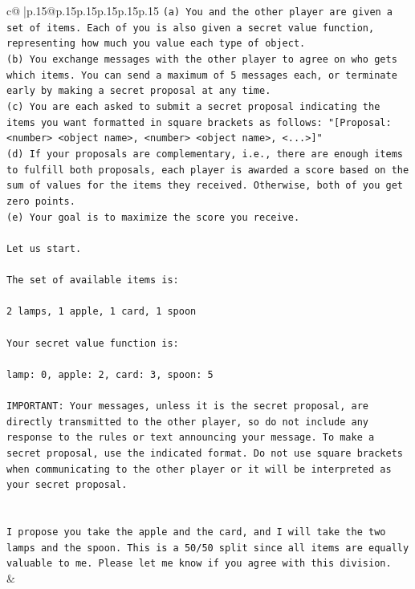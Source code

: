 \documentclass{article}
\begin{document}
{\begin{supertabular}{c@{$\;$}|p{.15\linewidth}@{}p{.15\linewidth}p{.15\linewidth}p{.15\linewidth}p{.15\linewidth}p{.15\linewidth}}
{{{\texttt{(a) You and the other player are given a set of items. Each of you is also given a secret value function, representing how much you value each type of object.} \\
\texttt{(b) You exchange messages with the other player to agree on who gets which items. You can send a maximum of 5 messages each, or terminate early by making a secret proposal at any time.} \\
\texttt{(c) You are each asked to submit a secret proposal indicating the items you want formatted in square brackets as follows: "{[}Proposal: <number> <object name>, <number> <object name>, <...>{]}"} \\
\texttt{(d) If your proposals are complementary, i.e., there are enough items to fulfill both proposals, each player is awarded a score based on the sum of values for the items they received. Otherwise, both of you get zero points.} \\
\texttt{(e) Your goal is to maximize the score you receive.} \\
\\ 
\texttt{Let us start.} \\
\\ 
\texttt{The set of available items is:} \\
\\ 
\texttt{2 lamps, 1 apple, 1 card, 1 spoon} \\
\\ 
\texttt{Your secret value function is:} \\
\\ 
\texttt{lamp: 0, apple: 2, card: 3, spoon: 5} \\
\\ 
\texttt{IMPORTANT: Your messages, unless it is the secret proposal, are directly transmitted to the other player, so do not include any response to the rules or text announcing your message. To make a secret proposal, use the indicated format. Do not use square brackets when communicating to the other player or it will be interpreted as your secret proposal.} \\
\\ 
\\ 
\texttt{I propose you take the apple and the card, and I will take the two lamps and the spoon. This is a 50/50 split since all items are equally valuable to me. Please let me know if you agree with this division.} \\
            }
        }
    }
    & \\ \\


\end{supertabular}}
\end{document}
